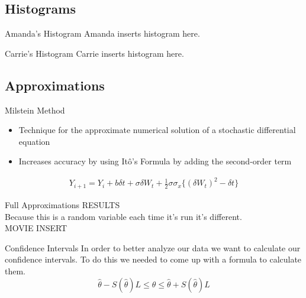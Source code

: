 
\subsection{Histograms}

\begin{frame}{Amanda's Histogram}
Amanda inserts histogram here. 
\end{frame}

\begin{frame}{Carrie's Histogram}
Carrie inserts histogram here. 
\end{frame}



\subsection{Approximations}

\begin{frame}{Milstein Method}
	\begin{itemize}
		\item Technique for the approximate numerical solution of a stochastic differential equation
		\item Increases accuracy by using It\^o's Formula by adding the second-order term
	\end{itemize} 

	\begin{align*}
		Y_{i+1} = Y_i +b\delta t + \sigma \delta W_t + \frac{1}{2} \sigma \sigma_x \{(\delta W_t)^2 - \delta t\} 
	\end{align*}

\end{frame}

\begin{frame}{Full Approximations}
RESULTS \\
Because this is a random variable each time it's run it's different. \\
MOVIE INSERT 
\end{frame}

\begin{frame}{Confidence Intervals}
In order to better analyze our data we want to calculate our confidence intervals. To do this we needed to come up with a formula to calculate them. \\
$$\hat{\theta} - S(\hat{\theta}) L \leq \theta \leq \hat{\theta} + S(\hat{\theta}) L$$ \\
\end{frame}


